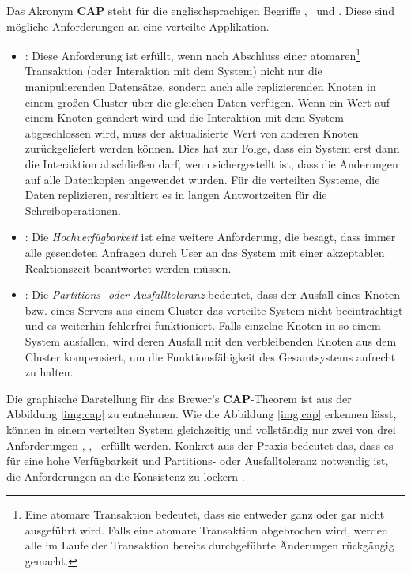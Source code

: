Das Akronym \textbf{CAP} steht für die englischsprachigen Begriffe  \Cap, \cAp\ und \caP. Diese sind mögliche Anforderungen an eine verteilte Applikation.
\begin{itemize}
\item \Cap: Diese Anforderung ist erfüllt, wenn nach Abschluss einer atomaren\footnote{Eine atomare Transaktion bedeutet, dass sie entweder ganz oder gar nicht ausgeführt wird. Falls eine atomare Transaktion abgebrochen wird, werden alle im Laufe der Transaktion bereits durchgeführte Änderungen rückgängig gemacht.} Transaktion (oder Interaktion mit dem System) nicht nur die manipulierenden Datensätze, sondern auch alle replizierenden Knoten in einem großen Cluster über die gleichen Daten verfügen. Wenn ein Wert auf einem Knoten geändert wird und die Interaktion mit dem System abgeschlossen wird, muss der aktualisierte Wert von anderen Knoten zurückgeliefert werden können. Dies hat zur Folge, dass ein System erst dann die Interaktion abschließen darf, wenn sichergestellt ist, dass die Änderungen auf alle Datenkopien angewendet wurden. Für die verteilten Systeme, die Daten replizieren, resultiert es in langen Antwortzeiten für die Schreiboperationen.

\item \cAp: Die \textit{Hochverfügbarkeit} ist eine weitere Anforderung, die besagt, dass immer alle gesendeten Anfragen durch User an das System mit einer akzeptablen Reaktionszeit beantwortet werden müssen.

\item \caP: Die \textit{Partitions- oder Ausfalltoleranz} bedeutet, dass der Ausfall eines Knoten bzw. eines Servers aus einem Cluster das verteilte System nicht beeinträchtigt und es weiterhin fehlerfrei funktioniert. Falls einzelne Knoten in so einem System ausfallen, wird deren Ausfall mit den verbleibenden Knoten aus dem Cluster kompensiert, um die Funktionsfähigkeit des Gesamtsystems aufrecht zu halten.

\end{itemize}

Die graphische Darstellung für das Brewer's \textbf{CAP}-Theorem ist aus der Abbildung \ref{img:cap} zu entnehmen. Wie die Abbildung \ref{img:cap} erkennen lässt, können in einem verteilten System gleichzeitig und vollständig nur zwei von drei Anforderungen  \Cap, \cAp, \caP\ erfüllt werden. Konkret aus der Praxis bedeutet das, dass es für eine hohe Verfügbarkeit und Partitions- oder Ausfalltoleranz notwendig ist, die Anforderungen an die Konsistenz zu lockern \cite[S. 31]{Edlich.2011}.

